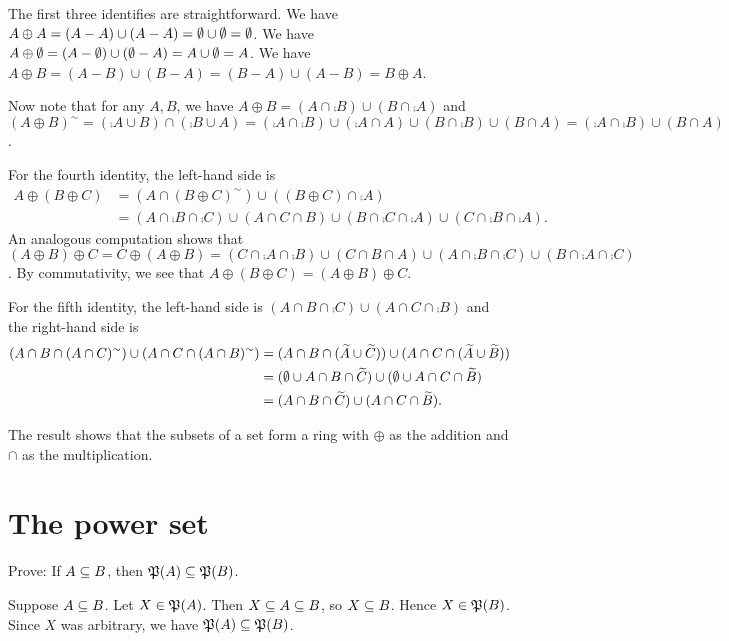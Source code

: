 \begin{solution}
The first three identifies are straightforward.
We have $A\oplus A = (A-A)\cup(A-A)=\emptyset\cup\emptyset=\emptyset$.
We have $A\oplus\emptyset = (A-\emptyset)\cup(\emptyset-A)=A\cup\emptyset=A$.
We have $A\oplus B=(A-B)\cup(B-A)=(B-A)\cup(A-B)=B\oplus A$.

Now note that for any $A,B$, we have $A\oplus B=(A\cap\comp B)\cup (B\cap\comp A)$ and
$(A\oplus B)^{\sim}=(\comp A\cup B)\cap(\comp B\cup A)
=(\comp A\cap\comp B)\cup(\comp A\cap A)\cup(B\cap\comp B)\cup(B\cap A)=(\comp A\cap\comp B)\cup (B\cap A)$.

For the fourth identity, the left-hand side is
\[
\begin{aligned}
A\oplus(B\oplus C) &= (A\cap (B\oplus C)^{\sim})\cup((B\oplus C)\cap\comp A)\\
&=(A\cap\comp B\cap\comp C)\cup(A\cap C\cap B)\cup(B\cap\comp C\cap\comp A)\cup(C\cap \comp B\cap\comp A).
\end{aligned}
\]
An analogous computation shows that $(A\oplus B)\oplus C=C\oplus(A\oplus B)
=(C\cap\comp A\cap\comp B)\cup(C\cap B\cap A)\cup(A\cap\comp B\cap\comp C)\cup(B\cap \comp A\cap\comp C)$.
By commutativity, we see that $A\oplus(B\oplus C) = (A\oplus B)\oplus C$.

For the fifth identity, the left-hand side is $(A\cap B\cap\comp C)\cup (A\cap C\cap\comp B)$ and
the right-hand side is
\[
\begin{aligned}
(A\cap B\cap (A\cap C)^{\sim})\cup(A\cap C\cap(A\cap B)^{\sim})
&=(A\cap B\cap(\widetilde{A}\cup\widetilde{C}))\cup(A\cap C\cap(\widetilde{A}\cup\widetilde{B}))\\
&=(\emptyset \cup A\cap B\cap\widetilde{C})\cup(\emptyset\cup A\cap C\cap\widetilde{B})\\
&=(A\cap B\cap\widetilde{C})\cup(A\cap C\cap\widetilde{B}).
\end{aligned}
\]

The result shows that the subsets of a set form a ring with $\oplus$ as the addition
and $\cap$ as the multiplication.
\end{solution}


\section{The power set }
\begin{exercise}
Prove: If $A\subseteq B$, then $\operatorname{\mathfrak{P}}(A)\subseteq\operatorname{\mathfrak{P}}(B)$.
\end{exercise}

\begin{solution}
Suppose $A\subseteq B$. Let $X\in\operatorname{\mathfrak{P}}(A)$. Then $X\subseteq A\subseteq B$, so $X\subseteq B$. Hence $X\in\operatorname{\mathfrak{P}}(B)$.
Since $X$ was arbitrary, we have $\operatorname{\mathfrak{P}}(A)\subseteq\operatorname{\mathfrak{P}}(B)$.
\end{solution}

